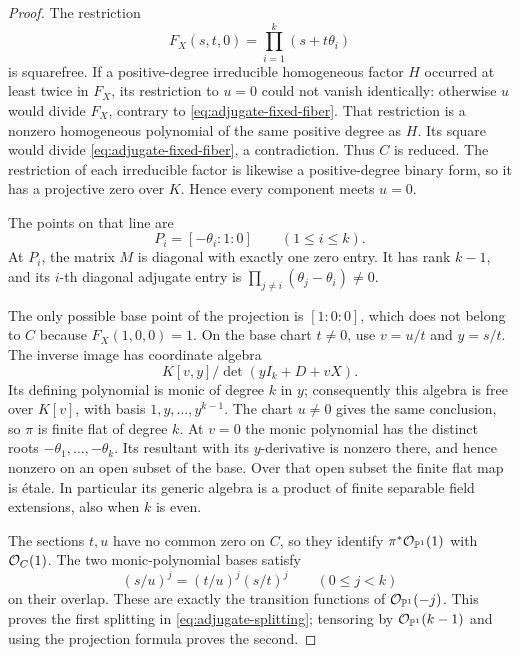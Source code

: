 \begin{proof}
The restriction
\begin{equation}
 \label{eq:adjugate-fixed-fiber}
 F_X(s,t,0)=\prod_{i=1}^k(s+t\theta_i)
\end{equation}
is squarefree.  If a positive-degree irreducible homogeneous factor
\(H\) occurred at least twice in \(F_X\), its restriction to \(u=0\)
could not vanish identically: otherwise \(u\) would divide \(F_X\),
contrary to \eqref{eq:adjugate-fixed-fiber}.  That restriction is a
nonzero homogeneous polynomial of the same positive degree as \(H\).
Its square would divide \eqref{eq:adjugate-fixed-fiber}, a contradiction.
Thus \(C\) is reduced.  The restriction of each irreducible factor is
likewise a positive-degree binary form, so it has a projective zero
over \(K\).  Hence every component meets \(u=0\).

The points on that line are
\[
 P_i=[-\theta_i:1:0]\qquad(1\le i\le k).
\]
At \(P_i\), the matrix \(M\) is diagonal with exactly one zero entry.
It has rank \(k-1\), and its \(i\)-th diagonal adjugate entry is
\(\prod_{j\ne i}(\theta_j-\theta_i)\ne0\).

The only possible base point of the projection is \([1:0:0]\), which
does not belong to \(C\) because \(F_X(1,0,0)=1\).
On the base chart \(t\ne0\), use \(v=u/t\) and \(y=s/t\).  The inverse
image has coordinate algebra
\[
 K[v,y]\big/\det(yI_k+D+vX).
\]
Its defining polynomial is monic of degree \(k\) in \(y\); consequently
this algebra is free over \(K[v]\), with basis
\(1,y,\ldots,y^{k-1}\).  The chart \(u\ne0\) gives the same conclusion,
so \(\pi\) is finite flat of degree \(k\).
At \(v=0\) the monic polynomial has the distinct roots
\(-\theta_1,\ldots,-\theta_k\).
Its resultant with its \(y\)-derivative is nonzero there, and hence
nonzero on an open subset of the base.  Over that open subset the
finite flat map is \'{e}tale.  In particular its generic algebra is
a product of finite separable field extensions, also when \(k\) is even.

The sections \(t,u\) have no common zero on \(C\), so they identify
\(\pi^*\mathcal O_{\mathbb P^1}(1)\) with \(\mathcal O_C(1)\).
The two monic-polynomial bases satisfy
\[
 (s/u)^j=(t/u)^j(s/t)^j\qquad(0\le j<k)
\]
on their overlap.  These are exactly the transition functions of
\(\mathcal O_{\mathbb P^1}(-j)\).  This proves the first splitting in
\eqref{eq:adjugate-splitting}; tensoring by \(\mathcal O_{\mathbb P^1}(k-1)\)
and using the projection formula proves the second.
\end{proof}

